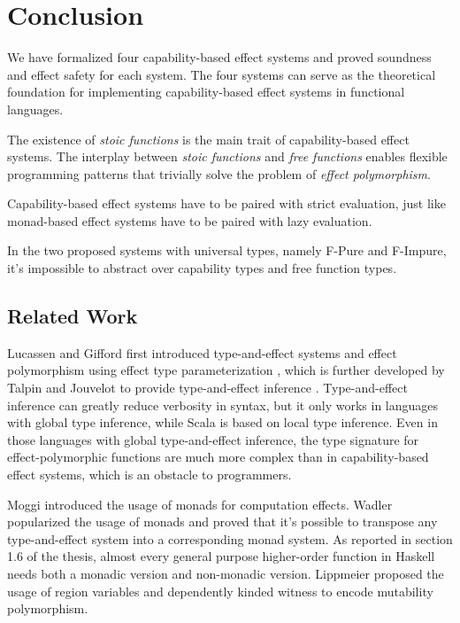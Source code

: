 \section{Conclusion}

We have formalized four capability-based effect systems and proved
soundness and effect safety for each system. The four systems can
serve as the theoretical foundation for implementing capability-based
effect systems in functional languages.

The existence of \emph{stoic functions} is the main trait of
capability-based effect systems. The interplay between \emph{stoic
  functions} and \emph{free functions} enables flexible programming
patterns that trivially solve the problem of \emph{effect
  polymorphism}.

Capability-based effect systems have to be paired with strict
evaluation, just like monad-based effect systems have to be paired
with lazy evaluation.

In the two proposed systems with universal types, namely F-Pure and
F-Impure, it's impossible to abstract over capability types and free
function types.

\subsection{Related Work}

Lucassen and Gifford first introduced type-and-effect
systems\cite{gifford1986integrating} and effect polymorphism using
effect type parameterization \cite{lucassen1988polymorphic}, which is
further developed by Talpin and Jouvelot to provide type-and-effect
inference \cite{talpin1992polymorphic,
  talpin1994type}. Type-and-effect inference can greatly reduce
verbosity in syntax, but it only works in languages with global type
inference, while Scala is based on local type inference. Even in those
languages with global type-and-effect inference, the type signature
for effect-polymorphic functions are much more complex than in
capability-based effect systems, which is an obstacle to programmers.

Moggi introduced the usage of monads for computation
effects\cite{moggi1991notions}. Wadler popularized the usage of
monads\cite{wadler1992comprehending, wadler1995monads} and proved that
it's possible to transpose any type-and-effect system into a
corresponding monad system\cite{wadler2003marriage}. As reported in
section 1.6 of the thesis\cite{lippmeier2009type}, almost every
general purpose higher-order function in Haskell needs both a monadic
version and non-monadic version. Lippmeier proposed the usage of
region variables and dependently kinded witness to encode mutability
polymorphism\cite{lippmeier2009witnessing}.

